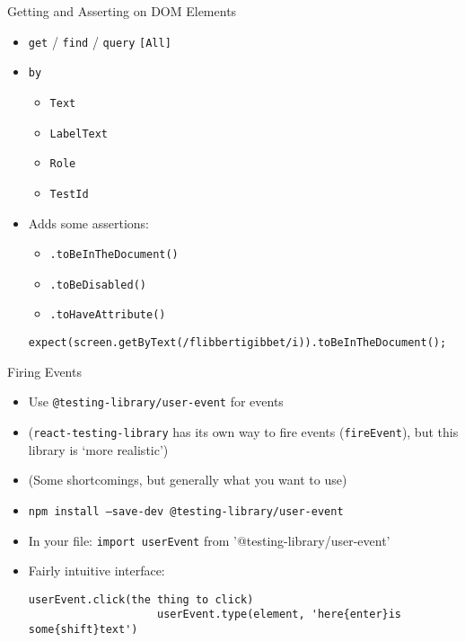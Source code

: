 \documentclass[t]{beamer}
\begin{document}
	\begin{frame}[fragile]{Getting and Asserting on DOM Elements}
		\begin{itemize}
			\item \texttt{get} / \texttt{find} / \texttt{query} \texttt{[All]}
			\item \texttt{by}
				\begin{itemize}
					\item \texttt{Text}
					\item \texttt{LabelText}
					\item \texttt{Role}
					\item \texttt{TestId}
				\end{itemize}
			\item Adds some assertions:
				\begin{itemize}
					\item \texttt{.toBeInTheDocument()}
					\item \texttt{.toBeDisabled()}
					\item \texttt{.toHaveAttribute()}
				\end{itemize}

				\begin{lstlisting}[autogobble]
					expect(screen.getByText(/flibbertigibbet/i)).toBeInTheDocument();
				\end{lstlisting}
		\end{itemize}
	\end{frame}

	\begin{frame}[fragile]{Firing Events}
		\begin{itemize}
			\item Use \texttt{@testing-library/user-event} for events
			\item (\texttt{react-testing-library} has its own way to fire events (\texttt{fireEvent}), but this library is `more realistic')
			\item (Some shortcomings, but generally what you want to use)
			\item \texttt{npm install --save-dev @testing-library/user-event}
			\item In your file: \texttt{import userEvent} from '@testing-library/user-event'
			\item Fairly intuitive interface:
				\begin{lstlisting}[autogobble]
					userEvent.click(the thing to click)
					userEvent.type(element, 'here{enter}is some{shift}text')
				\end{lstlisting}
		\end{itemize}
	\end{frame}
\end{document}
